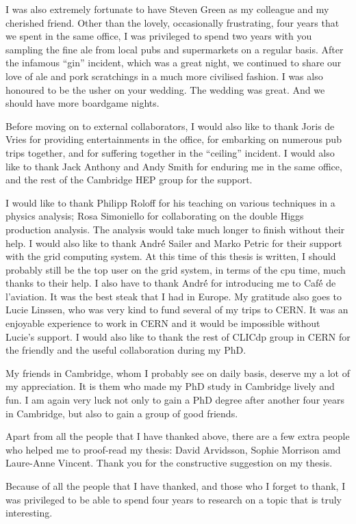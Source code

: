 \begin{acknowledgements}
  I was also extremely fortunate to have Steven Green as my colleague and my cherished friend. Other than the lovely, occasionally frustrating, four years that we spent in the same office,   I was privileged to spend two years with you sampling the fine ale from local pubs and supermarkets on a regular basis. After the infamous ``gin'' incident, which was a great night, we continued to share our love of ale and pork scratchings in a much more civilised fashion. I was also honoured to be the usher on your wedding. The wedding was great. And we should have more boardgame nights.
  
  Before moving on to external collaborators, I would also like to thank Joris de Vries for providing entertainments in the office, for embarking on numerous pub trips together, and for suffering together in the ``ceiling'' incident. I would also like to thank Jack Anthony and Andy Smith for enduring me in the same office, and the rest of the Cambridge HEP group for the support.
  
  I would like to thank Philipp Roloff for his teaching on various techniques in a physics analysis; Rosa Simoniello for collaborating on the double Higgs production analysis. The analysis would take much longer to finish without their help. I would also like to thank Andr\'{é} Sailer and Marko Petric for their support with the \CLIC grid computing system. At this time of this thesis is written, I should probably still be the top user on the grid system, in terms of the cpu time, much thanks to their help. I also have to thank Andr\'{é} for introducing me to Caf\'{é} de l'aviation. It was the best steak that I had in Europe. My gratitude also goes to Lucie Linssen, who was very kind to fund several of my trips to CERN. It was an enjoyable experience to work in CERN and it would be impossible without Lucie's support. I would also like to thank the rest of CLICdp group in CERN for the friendly and the useful collaboration during my PhD.
  
 My friends in Cambridge, whom I probably see on daily basis, deserve my a lot of my appreciation. It is them who made my PhD study in Cambridge lively and fun. I am again very luck not only to gain a PhD degree after another four years in Cambridge, but also to gain a group of good friends.
  
Apart from all the people that I have thanked above, there are a few extra people who helped me to proof-read my thesis: David Arvidsson, Sophie Morrison amd Laure-Anne Vincent. Thank you for the constructive suggestion on my thesis.
  
Because of all the people that I have thanked, and those who I forget to thank, I was privileged to be able to spend four years to research on a topic that is truly interesting. 


\end{acknowledgements}


